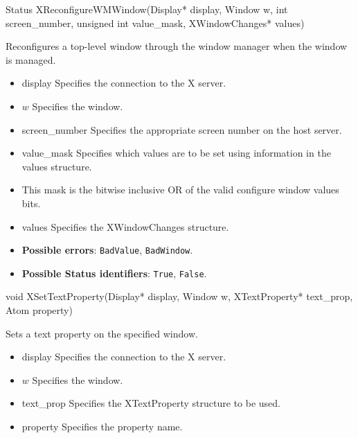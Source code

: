 \documentclass{report}
\begin{document}
\begin{itemize}
            \begin{cppcode}
            Status XReconfigureWMWindow(Display* display, Window w, int screen_number, unsigned int value_mask, XWindowChanges* values)
            \end{cppcode}
            \bigbreak \noindent
            Reconfigures a top-level window through the window manager when the window is managed.

            \begin{itemize}
                \item display Specifies the connection to the X server.
                \item $w$ Specifies the window.
                \item screen\_number Specifies the appropriate screen number on the host server.
                \item value\_mask Specifies which values are to be set using information in the values structure.
                \item This mask is the bitwise inclusive OR of the valid configure window values bits.
                \item values Specifies the XWindowChanges structure.
            \end{itemize}

            \begin{itemize}
                \item \textbf{Possible errors}: \texttt{BadValue}, \texttt{BadWindow}.
                \item \textbf{Possible Status identifiers}: \texttt{True}, \texttt{False}.
            \end{itemize}

            \begin{cppcode}
            void XSetTextProperty(Display* display, Window w, XTextProperty* text_prop, Atom property)
            \end{cppcode}
            \bigbreak \noindent
            Sets a text property on the specified window.

            \begin{itemize}
                \item display Specifies the connection to the X server.
                \item $w$ Specifies the window.
                \item text\_prop Specifies the XTextProperty structure to be used.
                \item property Specifies the property name.
            \end{itemize}


\end{itemize}
\end{document}
